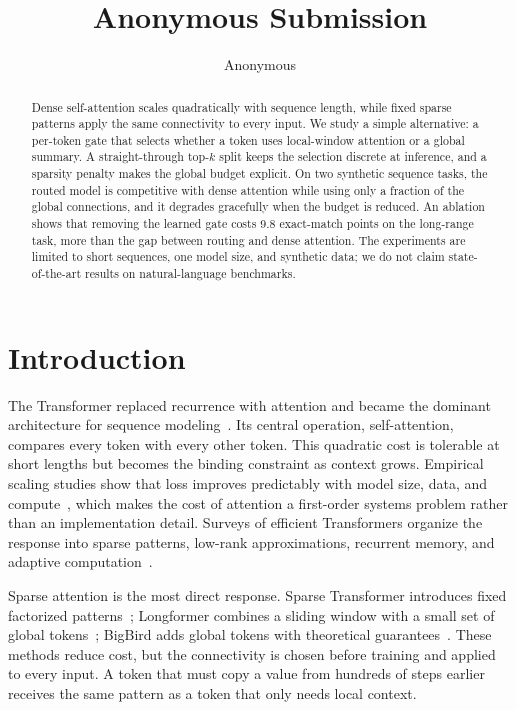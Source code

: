 \documentclass[10pt]{article}
\title{Anonymous Submission}
\author{Anonymous}
\date{}
\begin{document}
\maketitle

\begin{abstract}
Dense self-attention scales quadratically with sequence length, while fixed sparse patterns apply the same connectivity to every input. We study a simple alternative: a per-token gate that selects whether a token uses local-window attention or a global summary. A straight-through top-$k$ split keeps the selection discrete at inference, and a sparsity penalty makes the global budget explicit. On two synthetic sequence tasks, the routed model is competitive with dense attention while using only a fraction of the global connections, and it degrades gracefully when the budget is reduced. An ablation shows that removing the learned gate costs 9.8 exact-match points on the long-range task, more than the gap between routing and dense attention. The experiments are limited to short sequences, one model size, and synthetic data; we do not claim state-of-the-art results on natural-language benchmarks.
\end{abstract}


\section{Introduction}
\label{sec:intro}
The Transformer replaced recurrence with attention and became the dominant architecture for sequence modeling~\cite{Vaswani2017Attention}. Its central operation, self-attention, compares every token with every other token. This quadratic cost is tolerable at short lengths but becomes the binding constraint as context grows. Empirical scaling studies show that loss improves predictably with model size, data, and compute~\cite{Kaplan2020Scaling}, which makes the cost of attention a first-order systems problem rather than an implementation detail. Surveys of efficient Transformers organize the response into sparse patterns, low-rank approximations, recurrent memory, and adaptive computation~\cite{Tay2022Efficient}.

Sparse attention is the most direct response. Sparse Transformer introduces fixed factorized patterns~\cite{Child2019Generating}; Longformer combines a sliding window with a small set of global tokens~\cite{Beltagy2020Longformer}; BigBird adds global tokens with theoretical guarantees~\cite{Zaheer2020Big}. These methods reduce cost, but the connectivity is chosen before training and applied to every input. A token that must copy a value from hundreds of steps earlier receives the same pattern as a token that only needs local context.
\end{document}
